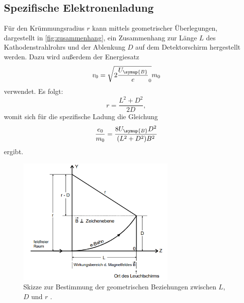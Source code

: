 \subsection{Spezifische Elektronenladung}
    Für den Krümmungsradius $r$ kann mittels geometrischer Überlegungen, dargestellt in \autoref{fig:zusammenhang}, ein 
    Zusammenhang zur Länge $L$ des Kathodenstrahlrohrs und der Ablenkung $D$ auf dem Detektorschirm hergestellt werden.
    Dazu wird außerdem der Energiesatz
    \begin{equation}
    \label{eqn:energiesatz}
        v_0 = \sqrt{2 \frac{U_{\symup{B}}} e_0} {m_0}
    \end{equation}
    verwendet. Es folgt:
    \begin{equation}
    \label{eqn:zusammenhang}
        r = \frac{L^2 + D^2}{2D},    
    \end{equation}     
    womit sich für die spezifische Ladung die Gleichung
    \begin{equation}
    \label{eqn:spezifisch}
        \frac{e_0}{m_0} = \frac{8 U_{\symup{B}} D^2}{(L^2 + D^2)B^2}
    \end{equation}
    ergibt.    
    \begin{figure}
        \centering
        \includegraphics[width=0.7\textwidth]{content/zusammenhang.png}
        \caption{Skizze zur Bestimmung der geometrischen Beziehungen zwischen $L$, $D$ und $r$ \cite{V501-und-V502}.}
        \label{fig:zusammenhang}
    \end{figure}